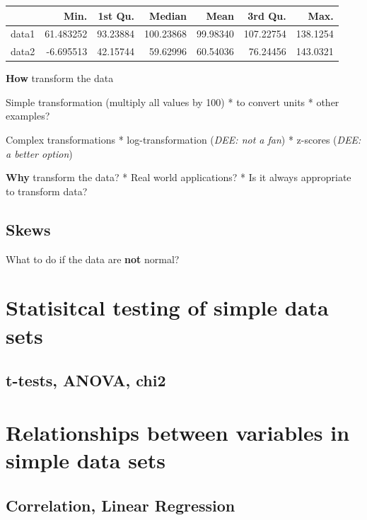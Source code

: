 \documentclass[
]{book}
\begin{document}
\begin{tabular}{l|r|r|r|r|r|r}
\hline
  & Min. & 1st Qu. & Median & Mean & 3rd Qu. & Max.\\
\hline
data1 & 61.483252 & 93.23884 & 100.23868 & 99.98340 & 107.22754 & 138.1254\\
\hline
data2 & -6.695513 & 42.15744 & 59.62996 & 60.54036 & 76.24456 & 143.0321\\
\hline
\end{tabular}

\textbf{How} transform the data

Simple transformation (multiply all values by 100)
* to convert units
* other examples?

Complex transformations
* log-transformation (\emph{DEE: not a fan})
* z-scores (\emph{DEE: a better option})

\textbf{Why} transform the data?
* Real world applications?
* Is it always appropriate to transform data?

\hypertarget{skews}{%
\subsection{Skews}\label{skews}}

What to do if the data are \textbf{not} normal?

\hypertarget{statisitcal-testing-of-simple-data-sets}{%
\section{Statisitcal testing of simple data sets}\label{statisitcal-testing-of-simple-data-sets}}

\hypertarget{t-tests-anova-chi2}{%
\subsection{t-tests, ANOVA, chi2}\label{t-tests-anova-chi2}}

\hypertarget{relationships-between-variables-in-simple-data-sets}{%
\section{Relationships between variables in simple data sets}\label{relationships-between-variables-in-simple-data-sets}}

\hypertarget{correlation-linear-regression}{%
\subsection{Correlation, Linear Regression}\label{correlation-linear-regression}}
\end{document}
